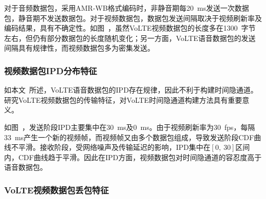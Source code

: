 对于音频数据包，采用AMR-WB格式编码时，非静音期每{20\ ms}发送一次数据包，静音期不发送数据包。对于视频数据包，数据包发送间隔取决于视频刷新率及编码结果，具有不确定性。如图\ ，虽然VoLTE视频数据包的长度多在{1300\ 字节}左右，但仍有部分数据包的长度随机变化；另一方面，VoLTE语音数据包的发送间隔具有规律性，而视频数据包多为密集发送。

\subsubsection{视频数据包IPD分布特征}
\label{chap:backinfo:volte:packets:ipd}
如本文\ 所述，VoLTE语音数据包的IPD存在规律，因此不利于构建时间隐通道。研究VoLTE视频数据包的传输特征，对VoLTE时间隐通道构建方法具有重要意义。


如图\ ，发送阶段IPD主要集中在{30\ ms}及{0\ ms}。由于视频刷新率为{30\ fps}，每隔{33\ ms}产生一个新的视频帧，而视频帧又由多个数据包组成，导致发送阶段CDF曲线不平滑。接收阶段，受网络噪声及传输延迟的影响，IPD集中在$[0,\ 30]$区间内，CDF曲线趋于平滑。因此在IPD方面，视频数据包对时间隐通道的容忍度高于语音数据包。

\subsubsection{VoLTE视频数据包丢包特征}
\label{chap:backinfo:volte:packets:dropout}

